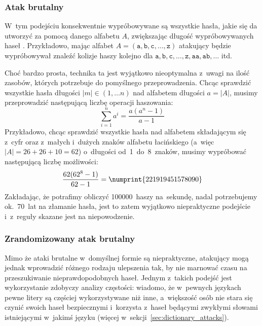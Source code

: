 \documentclass[12pt,a4paper,twoside]{article}
\begin{document}
\subsubsection{Atak brutalny}
W~tym podejściu konsekwentnie wypróbowywane są wszystkie hasła, jakie się da
utworzyć za pomocą danego alfabetu $A$, zwiększając długość wypróbowywanych
haseł . Przykładowo, mając alfabet $A=(\mathtt{a},
\mathtt{b}, \mathtt{c}, \ldots, \mathtt{z})$ atakujący będzie wypróbowywał
znaleźć kolizje haszy kolejno dla $\mathtt{a}, \mathtt{b}, \mathtt{c}, \ldots,
\mathtt{z}, \mathtt{aa}, \mathtt{ab}, \ldots$ itd.

Choć bardzo prosta, technika ta jest wyjątkowo nieoptymalna z~uwagi na ilość
zasobów, których potrzebuje do pomyślnego przeprowadzenia. Chcąc sprawdzić
wszystkie hasła długości $|m| \in (1, \ldots n)$ nad alfabetem długości
$a=|A|$, musimy przeprowadzić następującą liczbę operacji haszowania:
    $$\sum_{i=1}^n a^i = \frac{a(a^n-1)}{a-1}$$
Przykładowo, chcąc sprawdzić wszystkie hasła nad alfabetem składającym się
z~cyfr oraz z~małych i~dużych znaków alfabetu łacińskiego (a~więc $|A| =
26+26+10 = 62$) o~długości od~1~do~8~znaków, musimy wypróbować następującą
liczbę możliwości:
    $$\frac{62(62^8-1)}{62-1} = \numprint{221919451578090}$$
Zakładając, że potrafimy obliczyć 100000~haszy na~sekundę, nadal potrzebujemy
ok.~70~lat na złamanie hasła, jest to zatem wyjątkowo niepraktyczne podejście
i~z~reguły skazane jest na niepowodzenie.



\subsubsection{Zrandomizowany atak brutalny}
Mimo że ataki brutalne w~domyślnej formie są niepraktyczne, atakujący mogą
jednak wprowadzić różnego rodzaju ulepszenia tak, by nie marnować czasu na
przeszukiwanie nieprawdopodobnych haseł. Jednym z~takich podejść jest
wykorzystanie zdobyczy analizy częstości: wiadomo, że w~pewnych językach pewne
litery są częściej wykorzystywane niż inne, a~większość osób nie stara się
czynić swoich haseł bezpiecznymi i~korzysta z~haseł będącymi zwykłymi słowami
istniejącymi w~jakimś języku (więcej w~sekcji~\ref{sec:dictionary_attacks}).
\end{document}

